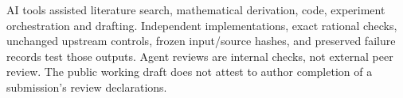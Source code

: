 \documentclass[10pt]{article}
\begin{document}
AI tools assisted literature search, mathematical derivation, code,
experiment orchestration and drafting. Independent implementations,
exact rational checks, unchanged upstream controls, frozen input/source
hashes, and preserved failure records test those outputs. Agent reviews
are internal checks, not external peer review. The public working draft
does not attest to author completion of a submission's review declarations.



\end{document}
